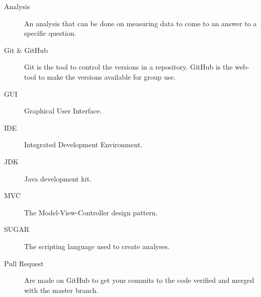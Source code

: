 \documentclass[a4paper]{article}
\begin{document}
\begin{description}

\item[Analysis] An analysis that can be done on measuring data to come to an answer to a specific question.
\item[Git \& GitHub] Git is the tool to control the versions in a repository. GitHub is the web-tool to make the versions available for group use.
\item[GUI] Graphical User Interface.
\item[IDE] Integrated Development Environment.
\item[JDK] Java development kit.
\item[MVC] The Model-View-Controller design pattern.
\item[SUGAR] The scripting language used to create analyses.
\item[Pull Request] Are made on GitHub to get your commits to the code verified and merged with the master branch.

\end{description}
\end{document}
